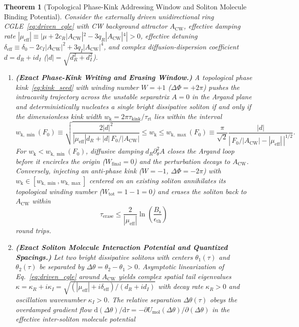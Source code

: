 \documentclass[11pt,letterpaper]{article}
\newtheorem{theorem}{Theorem}
\begin{document}
\begin{theorem}[Topological Phase-Kink Addressing Window and Soliton Molecule Binding Potential]
\label{thm:kink_molecule}
Consider the externally driven unidirectional ring CGLE~\eqref{eq:driven_cgle} with CW background attractor $A_{\mathrm{CW}}$, effective damping rate $|\mu_{\mathrm{eff}}| \equiv |\mu + 2c_R|A_{\mathrm{CW}}|^2 - 3q_R|A_{\mathrm{CW}}|^4| > 0$, effective detuning $\delta_{\mathrm{eff}} \equiv \delta_0 - 2c_I|A_{\mathrm{CW}}|^2 + 3q_I|A_{\mathrm{CW}}|^4$, and complex diffusion-dispersion coefficient $d = d_R + i d_I$ ($|d| = \sqrt{d_R^2 + d_I^2}$).
\begin{enumerate}
    \item[(a)] \textbf{(Exact Phase-Kink Writing and Erasing Window.)} A topological phase kink~\eqref{eq:kink_seed} with winding number $W = +1$ ($\Delta\Phi = +2\pi$) pushes the intracavity trajectory across the unstable separatrix $A = 0$ in the Argand plane and deterministically nucleates a single bright dissipative soliton if and only if the dimensionless kink width $w_{\mathrm{k}} = 2\pi\tau_{\mathrm{kink}}/\tau_{\mathrm{rt}}$ lies within the interval
    \begin{equation}
    w_{\mathrm{k},\min}(F_0) \equiv \sqrt{\frac{2|d|^2}{|\mu_{\mathrm{eff}}| d_R + |d|\,F_0 / |A_{\mathrm{CW}}|}} \le w_{\mathrm{k}} \le w_{\mathrm{k},\max}(F_0) \equiv \frac{\pi}{\sqrt{2}}\frac{|d|}{\left|\,F_0/|A_{\mathrm{CW}}| - |\mu_{\mathrm{eff}}|\,\right|^{1/2}}.
    \label{eq:thm1_kink_window}
    \end{equation}
    For $w_{\mathrm{k}} < w_{\mathrm{k},\min}(F_0)$, diffusive damping $d_R \partial_\theta^2 A$ closes the Argand loop before it encircles the origin ($W_{\mathrm{final}} = 0$) and the perturbation decays to $A_{\mathrm{CW}}$. Conversely, injecting an anti-phase kink ($W = -1$, $\Delta\Phi = -2\pi$) with $w_{\mathrm{k}} \in [w_{\mathrm{k},\min}, w_{\mathrm{k},\max}]$ centered on an existing soliton annihilates its topological winding number ($W_{\mathrm{tot}} = 1 - 1 = 0$) and erases the soliton back to $A_{\mathrm{CW}}$ within
    \begin{equation}
    \tau_{\mathrm{erase}} \le \frac{2}{|\mu_{\mathrm{eff}}|}\ln\!\left(\frac{B_{\mathrm{s}}}{\epsilon_{\mathrm{th}}}\right)
    \label{eq:thm1_erase_time}
    \end{equation}
    round trips.
    \item[(b)] \textbf{(Exact Soliton Molecule Interaction Potential and Quantized Spacings.)} Let two bright dissipative solitons with centers $\theta_1(\tau)$ and $\theta_2(\tau)$ be separated by $\Delta\theta = \theta_2 - \theta_1 > 0$. Asymptotic linearization of Eq.~\eqref{eq:driven_cgle} around $A_{\mathrm{CW}}$ yields complex spatial tail eigenvalues $\kappa = \kappa_R + i\kappa_I = \sqrt{(|\mu_{\mathrm{eff}}| + i\delta_{\mathrm{eff}})/(d_R + i d_I)}$ with decay rate $\kappa_R > 0$ and oscillation wavenumber $\kappa_I > 0$. The relative separation $\Delta\theta(\tau)$ obeys the overdamped gradient flow $\mathrm{d}(\Delta\theta)/\mathrm{d}\tau = -\partial U_{\mathrm{mol}}(\Delta\theta)/\partial(\Delta\theta)$ in the effective inter-soliton molecule potential

\end{enumerate}
\end{theorem}
\end{document}
